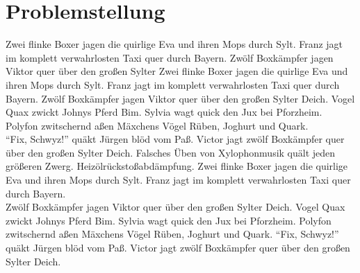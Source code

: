 \section{Problemstellung}
Zwei flinke Boxer jagen die quirlige Eva und ihren Mops durch Sylt. Franz jagt im komplett verwahrlosten Taxi quer durch Bayern. Zwölf Boxkämpfer jagen Viktor quer über den großen Sylter Zwei flinke Boxer jagen die quirlige Eva und ihren Mops durch Sylt. Franz jagt im komplett verwahrlosten Taxi quer durch Bayern. Zwölf Boxkämpfer jagen Viktor quer über den großen Sylter Deich. Vogel Quax zwickt Johnys Pferd Bim. Sylvia wagt quick den Jux bei Pforzheim. Polyfon zwitschernd aßen Mäxchens Vögel Rüben, Joghurt und Quark.\\
"`Fix, Schwyz!"' quäkt Jürgen blöd vom Paß. Victor jagt zwölf Boxkämpfer quer über den großen Sylter Deich. Falsches Üben von Xylophonmusik quält jeden größeren Zwerg. Heizölrückstoßabdämpfung. Zwei flinke Boxer jagen die quirlige Eva und ihren Mops durch Sylt. Franz jagt im komplett verwahrlosten Taxi quer durch Bayern.\\
Zwölf Boxkämpfer jagen Viktor quer über den großen Sylter Deich. Vogel Quax zwickt Johnys Pferd Bim. Sylvia wagt quick den Jux bei Pforzheim. Polyfon zwitschernd aßen Mäxchens Vögel Rüben, Joghurt und Quark. "`Fix, Schwyz!"' quäkt Jürgen blöd vom Paß. Victor jagt zwölf Boxkämpfer quer über den großen Sylter Deich.\\

\newpage